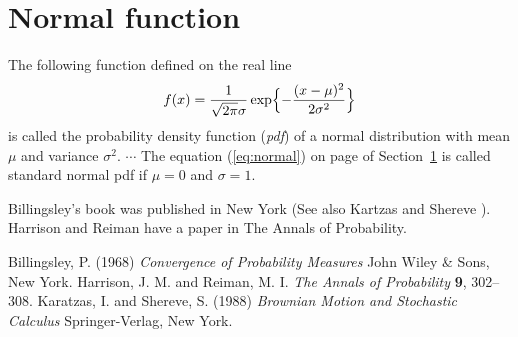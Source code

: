 \documentclass[11pt]{article}
\begin{document}
\section{Normal function} \label{ss:normal}
The following function defined on the real line
\begin{equation} \label{eq:normal}
f(x) = \frac{1}{\sqrt{2\pi}\sigma} \exp\Bigl\{-\frac{(x-\mu)^2}{2\sigma^2}\Bigr\}
\end{equation}
is called the probability density function (\emph{pdf}) of a normal distribution with mean $\mu$ and variance $\sigma^2$.
$\cdots$ The equation (\ref{eq:normal}) on page \pageref{eq:normal} of Section~\ref{ss:normal} is called standard normal pdf if $\mu=0$ and $\sigma=1$.

Billingsley's \cite[see Cahpter~5]{bill1} book was published in New York (See also Kartzas and Shereve \cite[Optional]{KandS}). Harrison and Reiman \cite{HandR} have a paper in The Annals of Probability.

\begin{thebibliography}{12345}
 Billingsley, P. (1968) \emph{Convergence of Probability Measures} John Wiley \& Sons, New York.
 Harrison, J. M. and Reiman, M. I. \emph{The Annals of Probability} \textbf{9}, 302--308.
 Karatzas, I. and Shereve, S. (1988) \emph{Brownian Motion and Stochastic Calculus} Springer-Verlag, New York.
\end{thebibliography}
 
\end{document}

